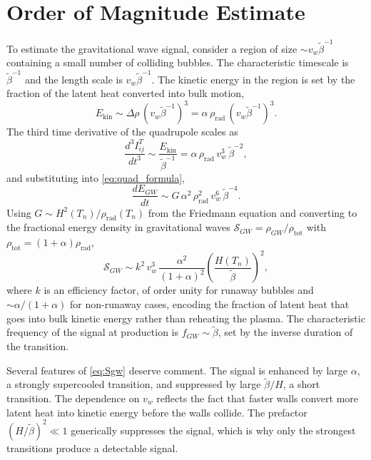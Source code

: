 \section{Order of Magnitude Estimate}

To estimate the gravitational wave signal, consider a region of size
$\sim v_w\tilde\beta^{-1}$ containing a small number of colliding
bubbles. The characteristic timescale is $\tilde\beta^{-1}$ and the
length scale is $v_w\tilde\beta^{-1}$. The kinetic energy in the
region is set by the fraction of the latent heat converted into bulk
motion,
\begin{equation}
	E_{\text{kin}} \sim \Delta\rho\,(v_w\tilde\beta^{-1})^3
	= \alpha\,\rho_{\text{rad}}\,(v_w\tilde\beta^{-1})^3.
\end{equation}
The third time derivative of the quadrupole scales as
\begin{equation}
	\frac{d^3 I_{ij}^T}{dt^3}
	\sim \frac{E_{\text{kin}}}{\tilde\beta^{-1}}
	= \alpha\,\rho_{\text{rad}}\,v_w^3\,\tilde\beta^{-2},
\end{equation}
and substituting into \eqref{eq:quad_formula},
\begin{equation}
	\frac{dE_{GW}}{dt}
	\sim G\,\alpha^2\,\rho_{\text{rad}}^2\,
	v_w^6\,\tilde\beta^{-4}.
\end{equation}
Using $G \sim H^2(T_n)/\rho_{\text{rad}}(T_n)$ from the Friedmann
equation and converting to the fractional energy density in
gravitational waves $\mathcal{S}_{GW} = \rho_{GW}/\rho_{\text{tot}}$
with $\rho_{\text{tot}} = (1+\alpha)\rho_{\text{rad}}$,
\begin{equation}
	\mathcal{S}_{GW} \sim k^2\,v_w^3\,
	\frac{\alpha^2}{(1+\alpha)^2}
	\left(\frac{H(T_n)}{\tilde\beta}\right)^2,
	\label{eq:Sgw}
\end{equation}
where $k$ is an efficiency factor, of order unity for runaway bubbles
and $\sim \alpha/(1+\alpha)$ for non-runaway cases, encoding the
fraction of latent heat that goes into bulk kinetic energy rather than
reheating the plasma. The characteristic frequency of the signal at
production is $f_{GW} \sim \tilde\beta$, set by the inverse duration
of the transition.

Several features of \eqref{eq:Sgw} deserve comment. The signal is
enhanced by large $\alpha$, a strongly supercooled transition, and
suppressed by large $\tilde\beta/H$, a short transition. The
dependence on $v_w$ reflects the fact that faster walls convert more
latent heat into kinetic energy before the walls collide. The
prefactor $(H/\tilde\beta)^2 \ll 1$ generically suppresses the signal,
which is why only the strongest transitions produce a detectable
signal.

